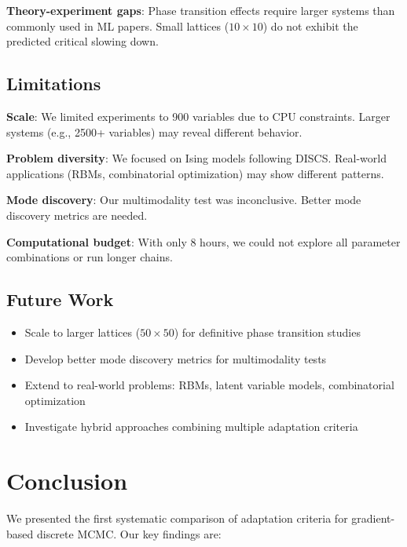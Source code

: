\documentclass{article}
\begin{document}
\textbf{Theory-experiment gaps}: Phase transition effects require larger systems than commonly used in ML papers. Small lattices ($10 \times 10$) do not exhibit the predicted critical slowing down.

\subsection{Limitations}

\textbf{Scale}: We limited experiments to 900 variables due to CPU constraints. Larger systems (e.g., 2500+ variables) may reveal different behavior.

\textbf{Problem diversity}: We focused on Ising models following DISCS. Real-world applications (RBMs, combinatorial optimization) may show different patterns.

\textbf{Mode discovery}: Our multimodality test was inconclusive. Better mode discovery metrics are needed.

\textbf{Computational budget}: With only 8 hours, we could not explore all parameter combinations or run longer chains.

\subsection{Future Work}

\begin{itemize}
    \item Scale to larger lattices ($50 \times 50$) for definitive phase transition studies
    \item Develop better mode discovery metrics for multimodality tests
    \item Extend to real-world problems: RBMs, latent variable models, combinatorial optimization
    \item Investigate hybrid approaches combining multiple adaptation criteria
\end{itemize}

\section{Conclusion}
\label{sec:conclusion}

We presented the first systematic comparison of adaptation criteria for gradient-based discrete MCMC. Our key findings are:
\end{document}
